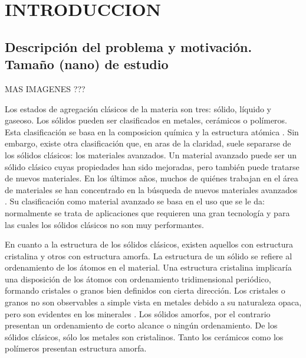 
\chapter{INTRODUCCION} %

\label{C1} %



\section{Descripción del problema y motivación. Tamaño (nano) de estudio}
\label{S1_1}

MAS IMAGENES ???

Los estados de agregación clásicos de la materia son tres: sólido, líquido y gaseoso. Los sólidos pueden ser clasificados en metales, cerámicos o polímeros. Esta clasificación se basa en la composicion química y la estructura atómica \citep{callister95}. Sin embargo, existe otra clasificación que, en aras de la claridad, suele separarse de los sólidos clásicos: los materiales avanzados. Un material avanzado puede ser un sólido clásico cuyas propiedades han sido mejoradas, pero también puede tratarse de nuevos materiales. En los últimos años, muchos de quiénes trabajan en el área de materiales se han concentrado en la búsqueda de nuevos materiales avanzados \citep{suryana11}. Su clasificación como material avanzado se basa en el uso que se le da: normalmente se trata de aplicaciones que requieren una gran tecnología y para las cuales los sólidos clásicos no son muy performantes.

En cuanto a la estructura de los sólidos clásicos, existen aquellos con estructura cristalina y otros con estructura amorfa. La estructura de un sólido se refiere al ordenamiento de los átomos en el material. Una estructura cristalina implicaría una disposición de los átomos con ordenamiento tridimensional periódico, formando cristales o granos bien definidos con cierta dirección. Los cristales o granos no son observables a simple vista en metales debido a su naturaleza opaca, pero son evidentes en los minerales \citep{smith96}. Los sólidos amorfos, por el contrario presentan un ordenamiento de corto alcance o ningún ordenamiento. De los sólidos clásicos, sólo los metales son cristalinos. Tanto los cerámicos como los polímeros presentan estructura amorfa.

